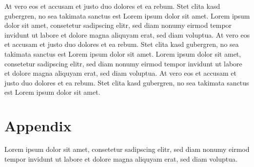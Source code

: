 \documentclass[a4paper,11pt,oneside]{book}
\begin{document}
At vero eos et accusam et justo duo dolores et ea rebum. Stet clita kasd gubergren, no sea takimata sanctus est Lorem ipsum dolor sit amet. Lorem ipsum dolor sit amet, consetetur sadipscing elitr, sed diam nonumy eirmod tempor invidunt ut labore et dolore magna aliquyam erat, sed diam voluptua. At vero eos et accusam et justo duo dolores et ea rebum. Stet clita kasd gubergren, no sea takimata sanctus est Lorem ipsum dolor sit amet. Lorem ipsum dolor sit amet, consetetur sadipscing elitr, sed diam nonumy eirmod tempor invidunt ut labore et dolore magna aliquyam erat, sed diam voluptua. At vero eos et accusam et justo duo dolores et ea rebum. Stet clita kasd gubergren, no sea takimata sanctus est Lorem ipsum dolor sit amet.   




\appendix
\chapter{Appendix}
Lorem ipsum dolor sit amet, consetetur sadipscing elitr, sed diam nonumy eirmod tempor invidunt ut labore et dolore magna aliquyam erat, sed diam voluptua. 
\end{document}
